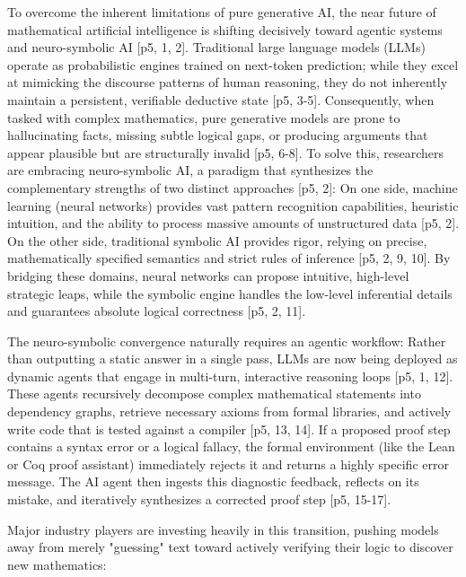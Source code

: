 To overcome the inherent limitations of pure generative AI, the near future of mathematical artificial intelligence is shifting decisively toward agentic systems and neuro-symbolic AI [p5, 1, 2]. Traditional large language models (LLMs) operate as probabilistic engines trained on next-token prediction; while they excel at mimicking the discourse patterns of human reasoning, they do not inherently maintain a persistent, verifiable deductive state [p5, 3-5]. Consequently, when tasked with complex mathematics, pure generative models are prone to hallucinating facts, missing subtle logical gaps, or producing arguments that appear plausible but are structurally invalid [p5, 6-8]. To solve this, researchers are embracing neuro-symbolic AI, a paradigm that synthesizes the complementary strengths of two distinct approaches [p5, 2]: On one side, machine learning (neural networks) provides vast pattern recognition capabilities, heuristic intuition, and the ability to process massive amounts of unstructured data [p5, 2]. On the other side, traditional symbolic AI provides rigor, relying on precise, mathematically specified semantics and strict rules of inference [p5, 2, 9, 10]. By bridging these domains, neural networks can propose intuitive, high-level strategic leaps, while the symbolic engine handles the low-level inferential details and guarantees absolute logical correctness [p5, 2, 11].

The neuro-symbolic convergence naturally requires an agentic workflow: Rather than outputting a static answer in a single pass, LLMs are now being deployed as dynamic agents that engage in multi-turn, interactive reasoning loops [p5, 1, 12]. These agents recursively decompose complex mathematical statements into dependency graphs, retrieve necessary axioms from formal libraries, and actively write code that is tested against a compiler [p5, 13, 14]. If a proposed proof step contains a syntax error or a logical fallacy, the formal environment (like the Lean or Coq proof assistant) immediately rejects it and returns a highly specific error message. The AI agent then ingests this diagnostic feedback, reflects on its mistake, and iteratively synthesizes a corrected proof step [p5, 15-17].

Major industry players are investing heavily in this transition, pushing models away from merely "guessing" text toward actively verifying their logic to discover new mathematics:


